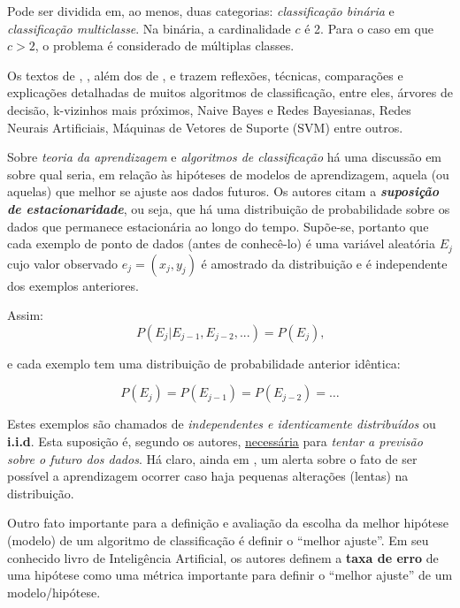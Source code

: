 Pode ser dividida em, ao menos, duas categorias: \textit{classificação binária} e \textit{classificação multiclasse}. Na binária, a cardinalidade $c$ é 2. Para o caso em que $c > 2$, o problema é considerado de múltiplas classes. \cite{Boscarioli2017} \cite{classification2013}

Os textos de \cite{classification2013}, \cite{performance_classification2013},  além dos de \cite{Wolpert:1996}, \cite{classification_survey2012} e \cite{using_data_mining2012}  trazem reflexões, técnicas, comparações e explicações detalhadas de muitos algoritmos de classificação, entre eles, árvores de decisão, k-vizinhos mais próximos, Naive Bayes e Redes Bayesianas, Redes Neurais Artificiais, Máquinas de Vetores de Suporte (SVM) entre outros.   

Sobre \textit{teoria da aprendizagem} e \textit{algoritmos de classificação} há uma discussão em \cite{Norvig2013} sobre qual seria, em relação às hipóteses de modelos de aprendizagem, aquela (ou aquelas) que melhor se ajuste aos dados futuros. Os autores citam a \textbf{\textit{suposição de estacionaridade}}, ou seja, que há uma distribuição de probabilidade sobre os dados que permanece estacionária ao longo do tempo. Supõe-se, portanto que cada exemplo de ponto de dados (antes de conhecê-lo) é uma variável aleatória $E_j$ cujo valor observado $e_j = (x_j, y_j)$ é amostrado da distribuição e é independente dos exemplos anteriores. 

Assim:
\begin{equation}
	P (E_j|E_{j-1},E_{j-2}, ... ) = P(E_j) \textrm{,} 
\end{equation}

e cada exemplo tem uma distribuição de probabilidade anterior idêntica:

\begin{equation}
P(E_j) = P(E_{j-1}) = P(E_{j-2}) = \dots 
\end{equation}

Estes exemplos são chamados de \textit{independentes e identicamente distribuídos} ou \textbf{i.i.d}. Esta suposição é, segundo os autores, \underline{necessária} para \textit{tentar a previsão sobre o futuro dos dados}. Há claro, ainda em \cite{Norvig2013}, um alerta sobre o fato de ser possível a aprendizagem ocorrer caso haja pequenas alterações (lentas) na distribuição.

Outro fato importante para a definição e avaliação da escolha da melhor hipótese (modelo) de um algoritmo de classificação é definir o ``melhor ajuste''. Em seu conhecido livro de Inteligência Artificial, os autores \cite{Norvig2013} definem a \textbf{taxa de erro} de uma hipótese como uma métrica importante para definir o ``melhor ajuste'' de um modelo/hipótese.

